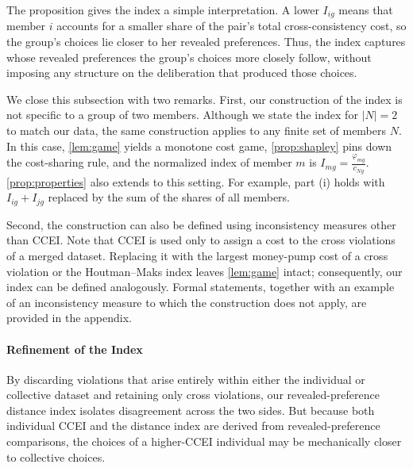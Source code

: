 \documentclass[11 pt]{article}
\begin{document}
The proposition gives the index a simple interpretation. A lower $I_{ig}$ means that member $i$ accounts for a smaller share of the pair's total cross-consistency cost, so the group's choices lie closer to her revealed preferences. Thus, the index captures whose revealed preferences the group's choices more closely follow, without imposing any structure on the deliberation that produced those choices.

We close this subsection with two remarks. First, our construction of the index is not specific to a group of two members. Although we state the index for $|N|=2$ to match our data, the same construction applies to any finite set of members $N$. In this case, \autoref{lem:game} yields a monotone cost game, \autoref{prop:shapley} pins down the cost-sharing rule, and the normalized index of member $m$ is $I_{mg} = \tfrac{\varphi_{mg}}{c_{Ng}}$. \autoref{prop:properties} also extends to this setting. For example, part (i) holds with $I_{ig} + I_{jg}$ replaced by the sum of the shares of all members.

Second, the construction can also be defined using inconsistency measures other than CCEI. Note that CCEI is used only to assign a cost to the cross violations of a merged dataset. Replacing it with the largest money-pump cost of a cross violation \citep{echenique2011money} or the Houtman--Maks index \citep{houtman1985determining} leaves \autoref{lem:game} intact; consequently, our index can be defined analogously. Formal statements, together with an example of an inconsistency measure to which the construction does not apply, are provided in the appendix.

\paragraph{Refinement of the Index} By discarding violations that arise entirely within either the individual or collective dataset and retaining only cross violations, our revealed-preference distance index isolates disagreement across the two sides. But because both individual CCEI and the distance index are derived from revealed-preference comparisons, the choices of a higher-CCEI individual may be mechanically closer to collective choices. 
\end{document}
